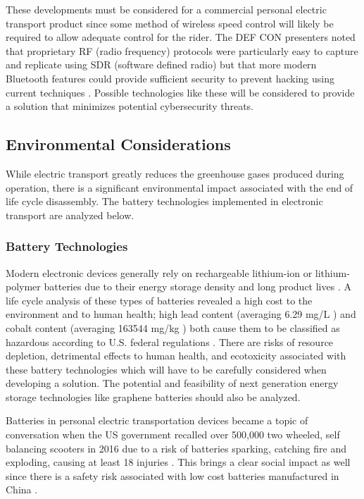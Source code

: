 These developments must be considered for a commercial personal electric transport product since some method of wireless speed control will likely be required to allow adequate control for the rider. The DEF CON presenters noted that proprietary RF (radio frequency) protocols were particularly easy to capture and replicate using SDR (software defined radio) \cite{Radio}\cite{DEFCON} but that more modern Bluetooth features could provide sufficient security to prevent hacking using current techniques \cite{DEFCON}. Possible technologies like these will be considered to provide a solution that minimizes potential cybersecurity threats.

\subsection{Environmental Considerations}
While electric transport greatly reduces the greenhouse gases produced during operation, there is a significant environmental impact associated with the end of life cycle disassembly. The battery technologies implemented in electronic transport are analyzed below.
\subsubsection{Battery Technologies}
Modern electronic devices generally rely on rechargeable lithium-ion or lithium-polymer batteries due to their energy storage density and long product lives \cite{BatteryRecharge}. A life cycle analysis of these types of batteries revealed a high cost to the environment and to human health; high lead content (averaging 6.29 mg/L \cite{BatteryRecharge}) and cobalt content (averaging 163544 mg/kg \cite{BatteryRecharge}) both cause them to be classified as hazardous according to U.S. federal regulations \cite{BatteryRecharge}. There are risks of resource depletion, detrimental effects to human health, and ecotoxicity associated with these battery technologies \cite{BatteryRecharge} which will have to be carefully considered when developing a solution. The potential and feasibility of next generation energy storage technologies like graphene batteries \cite{Graphene} should also be analyzed.

Batteries in personal electric transportation devices became a topic of conversation when the US government recalled over 500,000 two wheeled, self balancing scooters in 2016 due to a risk of batteries sparking, catching fire and exploding, causing at least 18 injuries \cite{CBCArticle}. This brings a clear social impact as well since there is a safety risk associated with low cost batteries manufactured in China \cite{CBCArticle}.


